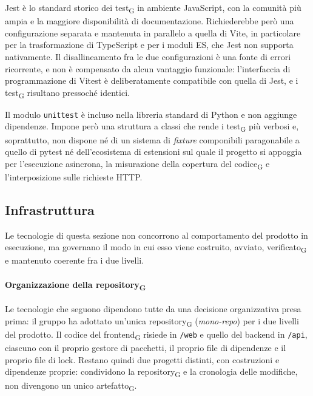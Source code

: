 \documentclass[a4paper, 10pt]{article}
\newenvironment{alternative}{%
  \begin{description}[
    style=nextline,
    leftmargin=0pt,
    labelindent=0pt,
    labelsep=0pt,
    font=\normalfont\bfseries,
    topsep=0.6em,
    itemsep=0.9em,
    parsep=0pt
  ]%
}{%
  \end{description}%
}
\newcommand{\altitem}[1]{\item[\textbullet\enspace #1]}
\begin{document}
\begin{alternative}

\altitem{Jest al posto di Vitest}
Jest è lo standard storico dei test\textsubscript{G} in ambiente JavaScript, con la comunità più ampia e la maggiore disponibilità di documentazione. Richiederebbe però una configurazione separata e mantenuta in parallelo a quella di Vite, in particolare per la trasformazione di TypeScript e per i moduli ES, che Jest non supporta nativamente. Il disallineamento fra le due configurazioni è una fonte di errori ricorrente, e non è compensato da alcun vantaggio funzionale: l'interfaccia di programmazione di Vitest è deliberatamente compatibile con quella di Jest, e i test\textsubscript{G} risultano pressoché identici.

\altitem{unittest al posto di pytest}
Il modulo \texttt{unittest} è incluso nella libreria standard di Python e non aggiunge dipendenze. Impone però una struttura a classi che rende i test\textsubscript{G} più verbosi e, soprattutto, non dispone né di un sistema di \textit{fixture} componibili paragonabile a quello di pytest né dell'ecosistema di estensioni sul quale il progetto si appoggia per l'esecuzione asincrona, la misurazione della copertura del codice\textsubscript{G} e l'interposizione sulle richieste HTTP.

\end{alternative}

\subsection{Infrastruttura}
\label{sec:tecnologie-infrastruttura}
Le tecnologie di questa sezione non concorrono al comportamento del prodotto in esecuzione, ma governano il modo in cui esso viene costruito, avviato, verificato\textsubscript{G} e mantenuto coerente fra i due livelli.

\paragraph{Organizzazione della repository\textsubscript{G}}
Le tecnologie che seguono dipendono tutte da una decisione organizzativa presa prima: il gruppo ha adottato un'unica repository\textsubscript{G} (\textit{mono-repo}) per i due livelli del prodotto. Il codice del frontend\textsubscript{G} risiede in \texttt{/web} e quello del backend in \texttt{/api}, ciascuno con il proprio gestore di pacchetti, il proprio file di dipendenze e il proprio file di lock. Restano quindi due progetti distinti, con costruzioni e dipendenze proprie: condividono la repository\textsubscript{G} e la cronologia delle modifiche, non divengono un unico artefatto\textsubscript{G}.
\end{document}
